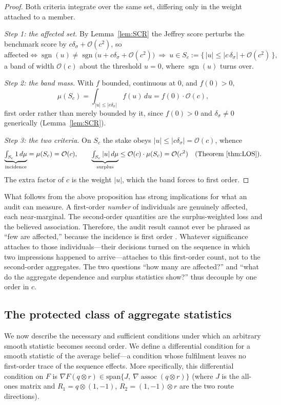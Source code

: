 \documentclass[a4paper,fleqn]{cas-sc}
\theoremstyle{remark}
\theoremstyle{definition}
\newcommand{\assoc}{\operatorname{assoc}}
\newcommand{\sgn}{\operatorname{sgn}}
\newcommand{\bigO}{\mathcal{O}}
\newcommand{\anchor}[1]{}
\begin{document}
\begin{proof}
Both criteria integrate over the same set, differing only in the weight attached to a member.

\emph{Step 1: the affected set.} By Lemma~\ref{lem:SCR} the Jeffrey score perturbs the benchmark
score by $c\delta_\sigma+\bigO(c^{2})$, so
\[
  \text{affected}
  \iff
  \sgn(u)\neq\sgn\bigl(u+c\delta_\sigma+\bigO(c^{2})\bigr)
  \ \Longrightarrow\
  u\in S_c:=\bigl\{\,|u|\le|c\,\delta_\sigma|+\bigO(c^{2})\,\bigr\},
\]
a band of width $\bigO(c)$ about the threshold $u=0$, where $\sgn(u)$ turns over.

\emph{Step 2: the band mass.} With $f$ bounded, continuous at $0$, and $f(0)>0$,
\[
  \mu(S_c)=\int_{|u|\le|c\delta_\sigma|}\!\! f(u)\,du=f(0)\cdot\bigO(c),
\]
first order rather than merely bounded by it, since $f(0)>0$ and $\delta_\sigma\neq0$
generically (Lemma~\ref{lem:SCR}).

\emph{Step 3: the two criteria.} On $S_c$ the stake obeys $|u|\le|c\delta_\sigma|=\bigO(c)$,
whence
\[
  \underbrace{\textstyle\int_{S_c} 1\,d\mu}_{\text{incidence}}=\mu(S_c)=\bigO(c),
  \qquad
  \underbrace{\textstyle\int_{S_c} |u|\,d\mu}_{\text{surplus}}
   \le \bigO(c)\cdot\mu(S_c)=\bigO(c^{2})
  \quad (\text{Theorem~\ref{thm:LOS}}).
\]
The extra factor of $c$ is the weight $|u|$, which the band forces to first order.
\end{proof}

What follows from the above proposition has strong implications for what an audit can measure. A first-order \emph{number} of individuals are genuinely affected, each near-marginal. The second-order quantities are the surplus-weighted loss and the believed association. Therefore, the audit result cannot ever be phrased as ``few are affected,'' because the incidence is first order \anchor{Prop.~SHR}. Whatever significance attaches to those individuals---their decisions turned on the sequence in which two impressions happened to arrive---attaches to this first-order count, not to the second-order aggregates. The two questions ``how many are affected?'' and ``what do the aggregate dependence and surplus statistics show?'' thus decouple by one order in $c$.

\subsection{The protected class of aggregate statistics}
\label{sec:protected}

We now describe the necessary and sufficient conditions under which an arbitrary smooth statistic becomes second order. We define a differential condition for a smooth statistic of the average belief---a condition whose fulfilment leaves no first-order trace of the sequence effects. More specifically, this differential condition on $F$ is $\nabla F(q\otimes r)\in\mathrm{span}\{J,\ \nabla\assoc(q\otimes r)\}$ (where $J$ is
the all-ones matrix and $R_1=q\otimes(1,-1)$, $R_2=(1,-1)\otimes r$ are the two route
directions).
\end{document}

